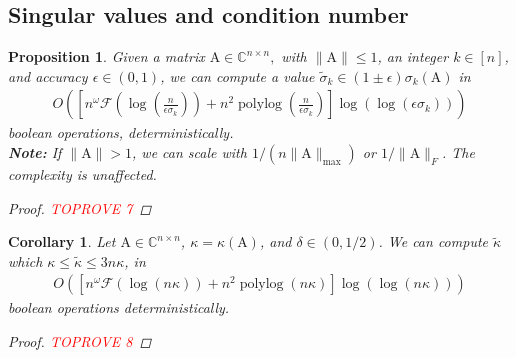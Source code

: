 \documentclass{article}
\newcommand{\lbrac}{\left[}
\newcommand{\rbrac}{\right]}
\newcommand{\lpar}{\left(}
\newcommand{\rpar}{\right)}
\newtheorem{proposition}{Proposition}[section]
\newtheorem{corollary}{Corollary}[section]
\DeclareMathOperator{\polylog}{polylog}
\newcommand\matA{\boldsymbol{\mathrm{A}}}
\newcommand{\flopcost}{\mathcal{F}}
\begin{document}
\subsection{Singular values and condition number}
\begin{proposition}
    \label{proposition:alg_sigmak}
        Given a matrix $\matA\in\mathbb{C}^{n\times n},$ with $\|\matA\|\leq 1$, an integer $k\in[n]$, and accuracy $\epsilon\in(0,1)$, we can compute a value $\widetilde\sigma_{k}\in (1\pm\epsilon)\sigma_k(\matA)$ in
        \begin{align*}
            O\lpar
                \lbrac
                    n^{\omega}\flopcost(\log(\tfrac{n}{\epsilon\sigma_k}))
                    +
                    n^2\polylog(\tfrac{n}{\epsilon\sigma_k})
                \rbrac
                \log(\log(\epsilon\sigma_k))
            \rpar
        \end{align*}
        boolean operations, deterministically.\\
        \textbf{Note:} If $\|\matA\|>1$, we can scale with $1/(n\|\matA\|_{\max})$ or $1/\|\matA\|_F$. The complexity is unaffected. 
    \begin{proof}\textcolor{red}{TOPROVE 7}\end{proof}
\end{proposition}
\begin{corollary}
    \label{corollary:alg_cond}
    Let $\matA\in\mathbb{C}^{n\times n}$, $\kappa=\kappa(\matA)$, and $\delta\in(0,1/2)$. We can compute $\widetilde\kappa$ which $\kappa\leq \widetilde\kappa\leq  3n\kappa$, in 
    \begin{align*}
        O\lpar
            \lbrac
                n^{\omega}\flopcost(\log(n\kappa))
                +
                n^2\polylog(n\kappa)
            \rbrac
            \log(\log(n\kappa))
        \rpar
    \end{align*}
    boolean operations deterministically. 
    \begin{proof}\textcolor{red}{TOPROVE 8}\end{proof}
\end{corollary}
\end{document}
